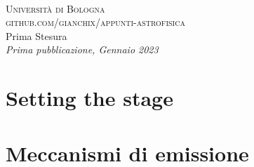 \documentclass[11pt]{book} %
\begin{document}
\newpage
~\vfill
\thispagestyle{empty}


\noindent \textsc{Università di Bologna}\\

\noindent \textsc{github.com/gianchix/appunti-astrofisica}\\ %

\noindent Prima Stesura\\ %

\noindent \textit{Prima pubblicazione, Gennaio 2023} %


\newpage
\thispagestyle{empty}




\pagestyle{empty} %

\hypersetup{linkcolor = black}
\tableofcontents %

\cleardoublepage %

\pagestyle{fancy} %
\hypersetup{linkcolor = ocre}



\mainmatter
{} %
\chapter{Setting the stage}




\chapter{Meccanismi di emissione}






\end{document}
